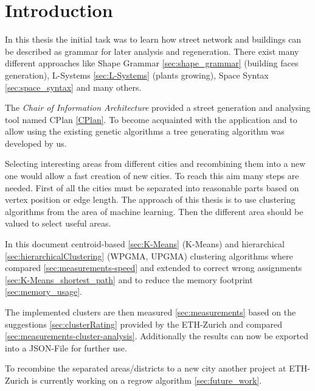 \chapter{Introduction}
In this thesis the initial task was to learn how street network and buildings can be described as grammar for later analysis and regeneration. There exist many different approaches like Shape Grammar \ref{sec:shape_grammar} (building faces generation), L-Systems \ref{sec:L-Systems} (plants growing), Space Syntax \ref{sec:space_syntax} and many others. 

The \textit{Chair of Information Architecture} provided a street generation and analysing tool named CPlan \ref{CPlan}. To become acquainted with the application and to allow using the existing genetic algorithms a tree generating algorithm was developed by us. 

Selecting interesting areas from different cities and recombining them into a new one would allow a fast creation of new cities. To reach this aim many steps are needed. First of all the cities must be separated into reasonable parts based on vertex position or edge length. The approach of this thesis is to use clustering algorithms from the area of machine learning. Then the different area should be valued to select useful areas.

In this document centroid-based \ref{sec:K-Means} (K-Means) and hierarchical \ref{sec:hierarchicalClustering} (WPGMA, UPGMA) clustering algorithms where compared \ref{sec:measurements-speed} and extended to correct wrong assignments \ref{sec:K-Means_shortest_path} and to reduce the memory footprint \ref{sec:memory_usage}. %

The implemented clusters are then measured \ref{sec:measurements} based on the suggestions \ref{sec:clusterRating} provided by the ETH-Zurich and compared \ref{sec:measurements-cluster-analysis}. Additionally the results can now be exported into a JSON-File for further use.

To recombine the separated areas/districts to a new city another project at ETH-Zurich is currently working on a regrow algorithm \ref{sec:future_work}. 